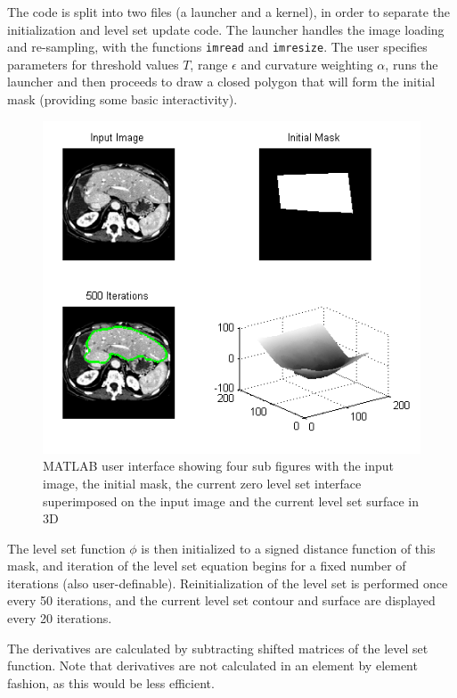 The code is split into two files (a launcher and a kernel), in order to separate the initialization and level set update code. The launcher handles the image loading and re-sampling, with the functions \texttt{imread} and \texttt{imresize}. The user specifies parameters for threshold values $T$, range $\epsilon$ and curvature weighting $\alpha$, runs the launcher and then proceeds to draw a closed polygon that will form the initial mask (providing some basic interactivity). 

\begin{figure}[h]
	\centering
		\includegraphics[scale=0.6]{images/matlab.png}
	\caption{MATLAB user interface showing four sub figures with the input image, the initial mask, the current zero level set interface superimposed on the input image and the current level set surface in 3D}
	\label{fig:matlab}
\end{figure}

The level set function $\phi$ is then initialized to a signed distance function of this mask, and iteration of the level set equation begins for a fixed number of iterations (also user-definable). Reinitialization of the level set is performed once every 50 iterations, and the current level set contour and surface are displayed every 20 iterations.

The derivatives are calculated by subtracting shifted matrices of the level set function. Note that derivatives are not calculated in an element by element fashion, as this would be less efficient.

